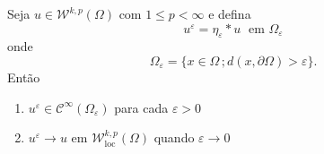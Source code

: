 \documentclass[a4paper, 11pt]{book}
\theoremstyle{definition}
\newcommand{\cC}{\mathcal{C}}
\newcommand{\cW}{\mathcal{W}}
\begin{document}
\begin{tbox} \label{thm:aprox1}
    Seja $u \in \cW^{k,p}(\Omega)$ com $1 \leqslant p < \infty$ e defina
    \[
        u^{\varepsilon} = \eta_{\varepsilon} * u \;\text{ em } \Omega_\varepsilon
    \]
    onde
    \[
        \Omega_\varepsilon = \{ x \in \Omega \,; d(x,\partial\Omega) > \varepsilon\}.
    \]
    Então
    \begin{enumerate}[leftmargin=*, label=\textbf{(\alph*)}]
        \item $u^\varepsilon \in \cC^{\infty}(\Omega_\varepsilon)$ para cada $\varepsilon > 0$
        \item $u^\varepsilon \to u$ em $\cW^{k,p}_{\mathrm{loc}}(\Omega)$ quando $\varepsilon \to 0$
    \end{enumerate}
\end{tbox}
\end{document}
